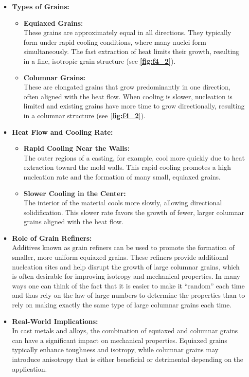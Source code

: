 \begin{itemize}
  \item \textbf{Types of Grains:}
    \begin{itemize}
      \item \textbf{Equiaxed Grains:} \\
        These grains are approximately equal in all directions. They typically form under rapid cooling conditions, where many nuclei form simultaneously. The fast extraction of heat limits their growth, resulting in a fine, isotropic grain structure (see \textbf{\autoref{fig:f4_2}}).
      
      \item \textbf{Columnar Grains:} \\
        These are elongated grains that grow predominantly in one direction, often aligned with the heat flow. When cooling is slower, nucleation is limited and existing grains have more time to grow directionally, resulting in a columnar structure (see \textbf{\autoref{fig:f4_2}}).
    \end{itemize}
  
  \item \textbf{Heat Flow and Cooling Rate:}
    \begin{itemize}
      \item \textbf{Rapid Cooling Near the Walls:} \\
        The outer regions of a casting, for example, cool more quickly due to heat extraction toward the mold walls. This rapid cooling promotes a high nucleation rate and the formation of many small, equiaxed grains.
      
      \item \textbf{Slower Cooling in the Center:} \\
        The interior of the material cools more slowly, allowing directional solidification. This slower rate favors the growth of fewer, larger columnar grains aligned with the heat flow.
    \end{itemize}
  
  \item \textbf{Role of Grain Refiners:} \\
    Additives known as grain refiners can be used to promote the formation of smaller, more uniform equiaxed grains. These refiners provide additional nucleation sites and help disrupt the growth of large columnar grains, which is often desirable for improving isotropy and mechanical properties. In many ways one can think of the fact that it is easier to make it ``random'' each time and thus rely on the law of large numbers to determine the properties than to rely on making exactly the same type of large columnar grains each time.
  
  \item \textbf{Real-World Implications:} \\
    In cast metals and alloys, the combination of equiaxed and columnar grains can have a significant impact on mechanical properties. Equiaxed grains typically enhance toughness and isotropy, while columnar grains may introduce anisotropy that is either beneficial or detrimental depending on the application.
\end{itemize}
